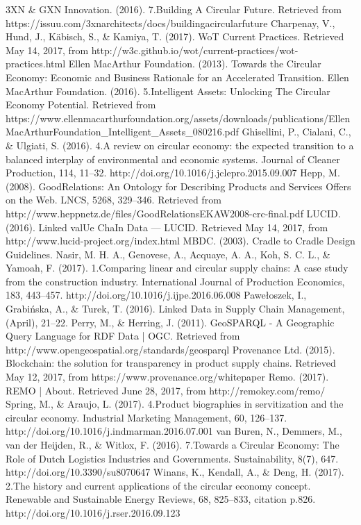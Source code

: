 \documentclass[runningheads,a4paper]{llncs}
\begin{document}
\begin{thebibliography}{4}

 3XN \& GXN Innovation. (2016). 7.Building A Circular Future. Retrieved from https://issuu.com/3xnarchitects/docs/buildingacircularfuture
 Charpenay, V., Hund, J., Käbisch, S., \& Kamiya, T. (2017). WoT Current Practices. Retrieved May 14, 2017, from http://w3c.github.io/wot/current-practices/wot-practices.html
 Ellen MacArthur Foundation. (2013). Towards the Circular Economy: Economic and Business Rationale for an Accelerated Transition.
 Ellen MacArthur Foundation. (2016). 5.Intelligent Assets: Unlocking The Circular Economy Potential. Retrieved from https://www.ellenmacarthurfoundation.org/assets/downloads/publications/EllenMacArthurFoundation\_Intelligent\_Assets\_080216.pdf
 Ghisellini, P., Cialani, C., \& Ulgiati, S. (2016). 4.A review on circular economy: the expected transition to a balanced interplay of environmental and economic systems. Journal of Cleaner Production, 114, 11--32. http://doi.org/10.1016/j.jclepro.2015.09.007
 Hepp, M. (2008). GoodRelations: An Ontology for Describing Products and Services Offers on the Web. LNCS, 5268, 329--346. Retrieved from http://www.heppnetz.de/files/GoodRelationsEKAW2008-crc-final.pdf
 LUCID. (2016). Linked valUe ChaIn Data --- LUCID. Retrieved May 14, 2017, from http://www.lucid-project.org/index.html
 MBDC. (2003). Cradle to Cradle Design Guidelines.
 Nasir, M. H. A., Genovese, A., Acquaye, A. A., Koh, S. C. L., \& Yamoah, F. (2017). 1.Comparing linear and circular supply chains: A case study from the construction industry. International Journal of Production Economics, 183, 443--457. http://doi.org/10.1016/j.ijpe.2016.06.008
 Pawełoszek, I., Grabińska, A., \& Turek, T. (2016). Linked Data in Supply Chain Management, (April), 21--22.
 Perry, M., \& Herring, J. (2011). GeoSPARQL - A Geographic Query Language for RDF Data | OGC. Retrieved from http://www.opengeospatial.org/standards/geosparql
 Provenance Ltd. (2015). Blockchain: the solution for transparency in product supply chains. Retrieved May 12, 2017, from https://www.provenance.org/whitepaper
 Remo. (2017). REMO | About. Retrieved June 28, 2017, from http://remokey.com/remo/
 Spring, M., \& Araujo, L. (2017). 4.Product biographies in servitization and the circular economy. Industrial Marketing Management, 60, 126--137. http://doi.org/10.1016/j.indmarman.2016.07.001
 van Buren, N., Demmers, M., van der Heijden, R., \& Witlox, F. (2016). 7.Towards a Circular Economy: The Role of Dutch Logistics Industries and Governments. Sustainability, 8(7), 647. http://doi.org/10.3390/su8070647
 Winans, K., Kendall, A., \& Deng, H. (2017). 2.The history and current applications of the circular economy concept. Renewable and Sustainable Energy Reviews, 68, 825--833, citation p.826. http://doi.org/10.1016/j.rser.2016.09.123

\end{thebibliography}
\end{document}
